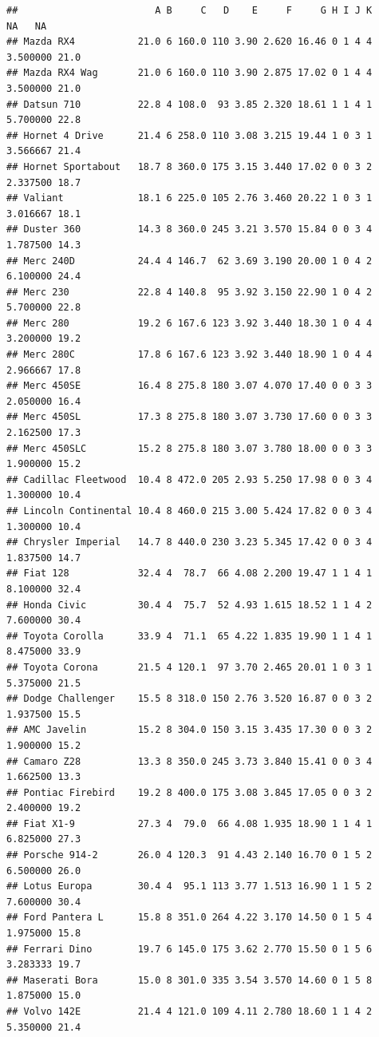 \documentclass[
]{book}
\begin{document}
\begin{verbatim}
##                        A B     C   D    E     F     G H I J K       NA   NA
## Mazda RX4           21.0 6 160.0 110 3.90 2.620 16.46 0 1 4 4 3.500000 21.0
## Mazda RX4 Wag       21.0 6 160.0 110 3.90 2.875 17.02 0 1 4 4 3.500000 21.0
## Datsun 710          22.8 4 108.0  93 3.85 2.320 18.61 1 1 4 1 5.700000 22.8
## Hornet 4 Drive      21.4 6 258.0 110 3.08 3.215 19.44 1 0 3 1 3.566667 21.4
## Hornet Sportabout   18.7 8 360.0 175 3.15 3.440 17.02 0 0 3 2 2.337500 18.7
## Valiant             18.1 6 225.0 105 2.76 3.460 20.22 1 0 3 1 3.016667 18.1
## Duster 360          14.3 8 360.0 245 3.21 3.570 15.84 0 0 3 4 1.787500 14.3
## Merc 240D           24.4 4 146.7  62 3.69 3.190 20.00 1 0 4 2 6.100000 24.4
## Merc 230            22.8 4 140.8  95 3.92 3.150 22.90 1 0 4 2 5.700000 22.8
## Merc 280            19.2 6 167.6 123 3.92 3.440 18.30 1 0 4 4 3.200000 19.2
## Merc 280C           17.8 6 167.6 123 3.92 3.440 18.90 1 0 4 4 2.966667 17.8
## Merc 450SE          16.4 8 275.8 180 3.07 4.070 17.40 0 0 3 3 2.050000 16.4
## Merc 450SL          17.3 8 275.8 180 3.07 3.730 17.60 0 0 3 3 2.162500 17.3
## Merc 450SLC         15.2 8 275.8 180 3.07 3.780 18.00 0 0 3 3 1.900000 15.2
## Cadillac Fleetwood  10.4 8 472.0 205 2.93 5.250 17.98 0 0 3 4 1.300000 10.4
## Lincoln Continental 10.4 8 460.0 215 3.00 5.424 17.82 0 0 3 4 1.300000 10.4
## Chrysler Imperial   14.7 8 440.0 230 3.23 5.345 17.42 0 0 3 4 1.837500 14.7
## Fiat 128            32.4 4  78.7  66 4.08 2.200 19.47 1 1 4 1 8.100000 32.4
## Honda Civic         30.4 4  75.7  52 4.93 1.615 18.52 1 1 4 2 7.600000 30.4
## Toyota Corolla      33.9 4  71.1  65 4.22 1.835 19.90 1 1 4 1 8.475000 33.9
## Toyota Corona       21.5 4 120.1  97 3.70 2.465 20.01 1 0 3 1 5.375000 21.5
## Dodge Challenger    15.5 8 318.0 150 2.76 3.520 16.87 0 0 3 2 1.937500 15.5
## AMC Javelin         15.2 8 304.0 150 3.15 3.435 17.30 0 0 3 2 1.900000 15.2
## Camaro Z28          13.3 8 350.0 245 3.73 3.840 15.41 0 0 3 4 1.662500 13.3
## Pontiac Firebird    19.2 8 400.0 175 3.08 3.845 17.05 0 0 3 2 2.400000 19.2
## Fiat X1-9           27.3 4  79.0  66 4.08 1.935 18.90 1 1 4 1 6.825000 27.3
## Porsche 914-2       26.0 4 120.3  91 4.43 2.140 16.70 0 1 5 2 6.500000 26.0
## Lotus Europa        30.4 4  95.1 113 3.77 1.513 16.90 1 1 5 2 7.600000 30.4
## Ford Pantera L      15.8 8 351.0 264 4.22 3.170 14.50 0 1 5 4 1.975000 15.8
## Ferrari Dino        19.7 6 145.0 175 3.62 2.770 15.50 0 1 5 6 3.283333 19.7
## Maserati Bora       15.0 8 301.0 335 3.54 3.570 14.60 0 1 5 8 1.875000 15.0
## Volvo 142E          21.4 4 121.0 109 4.11 2.780 18.60 1 1 4 2 5.350000 21.4
\end{verbatim}
\end{document}
